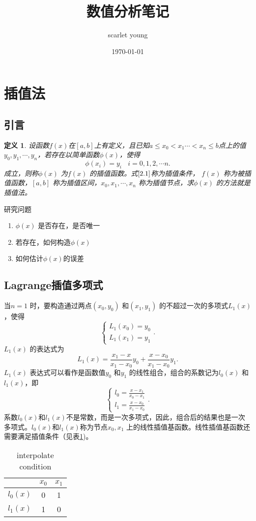 \documentclass[a4paper]{article}
\title{数值分析笔记}
\author{scarlet young}
\date{\today}
\begin{document}
\section{插值法}
\subsection{引言}
\newtheorem{definition}{定义}
\begin{definition}
	设函数$f(x)$在$[a,b]$上有定义，且已知$a \le x_0 < x_1 \cdots <x_{n} \le b $点上的值$y_0,y_1,\cdots, y_{n} $，若存在以简单函数$\phi(x)$，使得
	\[
		\phi(x_{i}) = y_{i} \ \ \ \ i=0,1,2,\cdots n \tag{2.1} \label{2.1}
	.\] 
	成立，则称$\phi(x)$ 为$f(x)$ 的插值函数。式$\ref{2.1}$称为插值条件， $f(x)$ 称为被插值函数，$[a,b]$ 称为插值区间，$x_0,x_1,\cdots,x_{n}$ 称为插值节点，求$\phi(x)$ 的方法就是插值法。
\end{definition}
研究问题
\begin{enumerate}
	\item $\phi(x)$ 是否存在，是否唯一
	\item 若存在，如何构造$\phi(x)$	
	\item 如何估计$\phi(x)$的误差
\end{enumerate}
\subsection{Lagrange插值多项式}
当$n=1$ 时，要构造通过两点$(x_0,y_0)$ 和$(x_1,y_1)$ 的不超过一次的多项式$L_1(x)$，使得
\[
	\begin{cases}
		L_1(x_0) = y_0 \\
		L_1(x_1) = y_1
	\end{cases}
.\]
$L_1(x)$ 的表达式为
\[
L_1(x) = \frac{x_1-x}{x_1-x_0} y_0 + \frac{x - x_0}{x_1 - x_0}y_1
.\] 
$L_1(x)$ 表达式可以看作是函数值$y_0$ 和$y_1$ 的线性组合，组合的系数记为$l_0(x)$ 和$l_1(x)$，即
\[
\begin{cases}
	l_0 = \frac{x - x_1}{x_0 - x_1} \\
	l_1 = \frac{x - x_0}{x_1 - x_0}
\end{cases}
.\] 
系数$l_0(x)$和$l_1(x)$不是常数，而是一次多项式，因此，组合后的结果也是一次多项式。$l_0(x)$和$l_1(x)$称为节点$x_0,x_1$ 上的线性插值基函数。线性插值基函数还需要满足插值条件（见表\ref{tab:label})。
\begin{table}[htbp]
	\centering
	\caption{interpolate condition}
	\label{tab:label}
	\begin{tabular}{|c|c|c|}
		\hline
		& $x_0$ & $x_1$ \\
		\hline
		$l_0(x)$ & 0 & 1 \\
		\hline
		$l_1(x)$ & 1 & 0 \\
		\hline
	\end{tabular}
\end{table}
\end{document}
